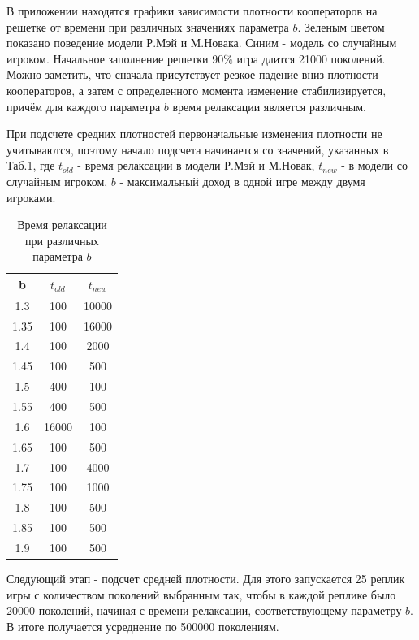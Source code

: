 \documentclass[12pt,a4paper]{article}
\begin{document}
		
	В приложении находятся графики зависимости плотности кооператоров на решетке 
	от времени при различных значениях параметра $b$. Зеленым цветом показано поведение
	модели Р.Мэй и М.Новака. Синим - модель со случайным игроком. Начальное заполнение решетки 90$\%$ игра длится 21000 поколений. Можно заметить, что сначала присутствует резкое падение вниз плотности кооператоров, а затем с определенного момента изменение 
	стабилизируется, причём для каждого параметра $b$ время релаксации является различным.
	
	\par При подсчете средних плотностей первоначальные изменения плотности не учитываются, поэтому начало подсчета начинается со значений, указанных в Таб.\ref{slice_tab}, где $t_{old}$ - время релаксации в модели Р.Мэй и М.Новак,  $t_{new}$ - в модели со случайным игроком,
	$b$ - максимальный доход в одной игре между двумя игроками.
	
	
	\vspace{10px}
	\begin{center}
	\begin{table}[H]
	\centering
		\begin{tabular}[H]{|c|c|c|}
			\hline 
			b&$t_{old}$& $t_{new} $ \\
			\hline 
			1.3& 100 & 10000 \\ 
			\hline 
			1.35& 100 & 16000 \\ 
			\hline 
			1.4& 100 & 2000 \\ 
			\hline 
			1.45& 100 & 500 \\ 
			\hline 
			1.5& 400 & 100 \\ 
			\hline 
			1.55& 400 & 500 \\ 
			\hline 
			1.6& 16000 & 100 \\ 
			\hline 
			1.65& 100 & 500 \\ 
			\hline 
			1.7& 100 & 4000 \\ 
			\hline 
			1.75& 100 & 1000 \\ 
			\hline 
			1.8& 100 & 500 \\ 
			\hline 
			1.85& 100 & 500 \\ 
			\hline 
			1.9& 100 & 500 \\ 
			\hline 
		\end{tabular}
		\caption{Время релаксации при различных параметра $b$}
		\label{slice_tab}
	\end{table}
	\end{center}	

	\par Следующий этап - подсчет средней плотности. Для этого запускается 25 реплик игры с количеством поколений выбранным так, чтобы в каждой реплике было 20000 поколений, начиная с времени релаксации, соответствующему параметру $b$. В итоге получается усреднение по 500000 поколениям. 
	
\end{document}
